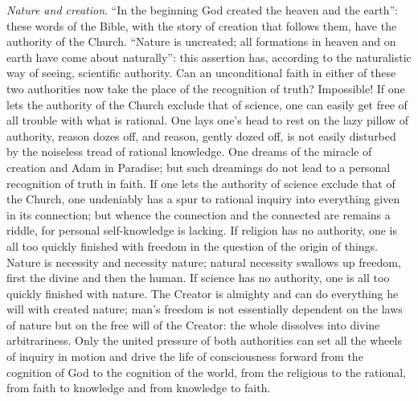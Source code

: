 \documentclass[12pt,a4paper,openany]{book}
\newcommand{\opage}[1]{\marginnote{\footnotesize\textit{[#1]}}}
\begin{document}
\emph{Nature and creation}. ``In the beginning God created the heaven and
the earth'': these words of the Bible, with the story of creation that
follows them, have the authority of the Church. ``Nature is uncreated;
all formations in heaven and on earth have come about naturally'': this
assertion has, according to the naturalistic way of seeing, scientific
authority. Can an unconditional faith in either of these two authorities
now take the place of the recognition of truth? Impossible! If one lets
the authority of the Church exclude that of science, one can easily get
free of all trouble with what is rational. One lays one's head to rest
on the lazy pillow of authority, reason dozes off, and reason, gently
dozed off, is not easily disturbed by the noiseless tread of rational
knowledge. %
One dreams of the miracle of creation and Adam in Paradise; but such
dreamings do not lead to a personal recognition of truth in faith. If
one lets the authority of science exclude that of the Church, one
undeniably has a spur to rational inquiry into everything given in its
connection; but whence the connection and the connected are remains a
riddle, for personal self-knowledge is lacking. If religion has no
authority, one is all too quickly finished with freedom in the question
of the origin of things. Nature is necessity and necessity nature;
natural necessity swallows up freedom, first the divine and then the
human. If science has no authority, one is all too quickly finished with
nature. The Creator is almighty and can do everything he will \opage{30}with
created nature; man's freedom is not essentially dependent on the laws
of nature but on the free will of the Creator: the whole dissolves into
divine arbitrariness. Only the united pressure of both authorities can
set all the wheels of inquiry in motion and drive the life of
consciousness forward from the cognition of God to the cognition of the
world, from the religious to the rational, from faith to knowledge and
from knowledge to faith.
\end{document}
